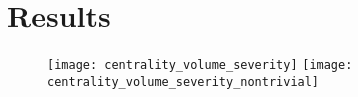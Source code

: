 \section{Results}


\begin{figure}[b]
\texttt{[image: centrality\_volume\_severity]}
\texttt{[image: centrality\_volume\_severity\_nontrivial]}
\end{figure}

